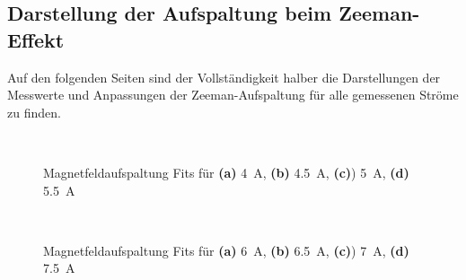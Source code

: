 \documentclass[11pt, a4paper]{article}
\begin{document}
\begin{appendix}
\section{Darstellung der Aufspaltung beim Zeeman-Effekt}
\label{app:penis}

Auf den folgenden Seiten sind der Vollständigkeit halber die Darstellungen der Messwerte und Anpassungen der Zeeman-Aufspaltung für alle gemessenen Ströme zu finden.

\begin{figure}
\begin{subfigure}[c]{0.5\textwidth}
\scalebox{0.75}{
	
	}
	\subcaption{}
\end{subfigure}
\begin{subfigure}[c]{0.5\textwidth}
\scalebox{0.75}{
	
	}
	\subcaption{}
\end{subfigure}
\\
\begin{subfigure}[c]{0.5\textwidth}
	\scalebox{0.75}{
	
	}
	\subcaption{}
\end{subfigure}
\begin{subfigure}[c]{0.5\textwidth}
\scalebox{0.75}{
	
	}
	\subcaption{}
\end{subfigure}
\caption{Magnetfeldaufspaltung Fits für \textbf{(a)} \SI{4}{\ampere}, \textbf{(b)} \SI{4.5}{\ampere}, \textbf{(c)}) \SI{5}{\ampere}, \textbf{(d)} \SI{5.5}{\ampere}}
\end{figure}

\begin{figure}
\begin{subfigure}[c]{0.5\textwidth}
\scalebox{0.75}{
	
	}
	\subcaption{}
\end{subfigure}
\begin{subfigure}[c]{0.5\textwidth}
\scalebox{0.75}{
	
	}
	\subcaption{}
\end{subfigure}
\\
\begin{subfigure}[c]{0.5\textwidth}
	\scalebox{0.75}{
	
	}
	\subcaption{}
\end{subfigure}
\begin{subfigure}[c]{0.5\textwidth}
\scalebox{0.75}{
	
	}
	\subcaption{}
\end{subfigure}
\caption{Magnetfeldaufspaltung Fits für \textbf{(a)} \SI{6}{\ampere}, \textbf{(b)} \SI{6.5}{\ampere}, \textbf{(c)}) \SI{7}{\ampere}, \textbf{(d)} \SI{7.5}{\ampere}}
\end{figure}


\end{appendix}
\end{document}
